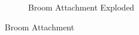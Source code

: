 \documentclass{article}
\begin{document}
\begin{figure}[ht!]
\begin{subfigure}{0.495\textwidth}
        \caption{Broom Attachment Exploded}
        \label{fig:broom_attachment_side}
    \end{subfigure}
    \caption{Broom Attachment}
\end{figure}



\end{document}
